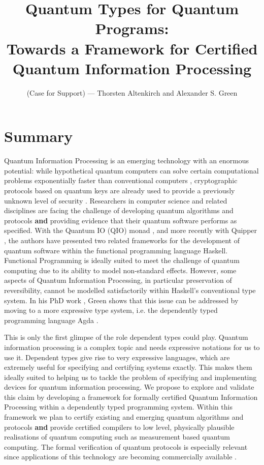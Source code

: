 \documentclass[a4paper]{article}
\title{Quantum Types for Quantum Programs:\\
 \Large Towards a Framework for Certified Quantum Information Processing
}
\author{(Case for Support) --- Thorsten Altenkirch and Alexander S. Green}
\date{}
\begin{document}
\maketitle
\section*{Summary}
Quantum Information Processing is an emerging technology with an enormous
potential: while hypothetical quantum computers can solve certain
computational problems exponentially faster than conventional
computers ,
cryptographic protocols based on quantum keys  are
already used to provide a previously unknown level of security
. Researchers in
computer science and related disciplines are facing the challenge of
developing quantum algorithms  and protocols \textbf{and}
providing evidence that their quantum software performs as
specified. With the Quantum IO (QIO) monad
, and more recently with Quipper
, the authors have
presented two related frameworks for the development of
quantum software within the functional programming language Haskell.
Functional
Programming is ideally suited to meet the challenge of quantum
computing due to its ability to model
non-standard effects. However, some aspects of Quantum Information Processing,
in particular preservation of reversibility, cannot be modelled satisfactorily
within Haskell's conventional type system. In his PhD work
, Green shows that this issue can be addressed
by moving to a more expressive type system, i.e. the dependently typed
programming language Agda . 

This is only the first glimpse of the role dependent types could play.
Quantum information processing is a complex topic and needs expressive
notations for us to use it. Dependent types give rise to very expressive
languages, which are extremely useful for specifying and certifying systems exactly.
This makes them ideally suited to helping us to tackle the
problem of specifying and implementing devices for quantum information
processing. We propose to explore and validate this claim by developing a
framework for formally certified Quantum Information Processing within a
dependently typed programming system. Within this framework we plan to
certify existing and emerging quantum algorithms and protocols \textbf{and}
provide certified compilers to low level, physically plausible
realisations of quantum computing such as measurement based quantum
computing.  The formal verification of 
quantum protocols is especially relevant since applications of this
technology are becoming commercially available .
\end{document}

